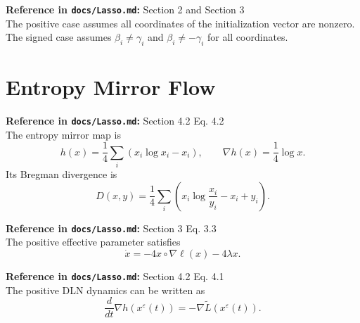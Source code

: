 \begin{definition}\label{def:lassoInitializations}
  \textbf{Reference in \texttt{docs/Lasso.md}:} Section 2 and Section 3\\
The positive case assumes all coordinates of the initialization vector are
nonzero.
The signed case assumes $\beta_i \ne \gamma_i$ and $\beta_i \ne -\gamma_i$ for
all coordinates.
\end{definition}

\section{Entropy Mirror Flow}

\begin{definition}\label{def:lassoEntropy}
  \textbf{Reference in \texttt{docs/Lasso.md}:} Section 4.2 Eq. 4.2\\
The entropy mirror map is
\[
  h(x)=\frac14\sum_i(x_i\log x_i-x_i),
  \qquad
  \nabla h(x)=\frac14\log x.
\]
Its Bregman divergence is
\[
  D(x,y)=\frac14\sum_i\left(x_i\log\frac{x_i}{y_i}-x_i+y_i\right).
\]
\end{definition}

\begin{lemma}\label{lem:posEffectiveODE}
  \textbf{Reference in \texttt{docs/Lasso.md}:} Section 3 Eq. 3.3\\
The positive effective parameter satisfies
\[
  \dot x = -4 x \circ \nabla \ell(x) - 4\lambda x.
\]
\end{lemma}

\begin{lemma}\label{lem:posMirrorFlow}
  \textbf{Reference in \texttt{docs/Lasso.md}:} Section 4.2 Eq. 4.1\\
The positive DLN dynamics can be written as
\[
  \frac{d}{dt}\nabla h(x^\varepsilon(t))
    = -\nabla \widetilde L(x^\varepsilon(t)).
\]
\end{lemma}


